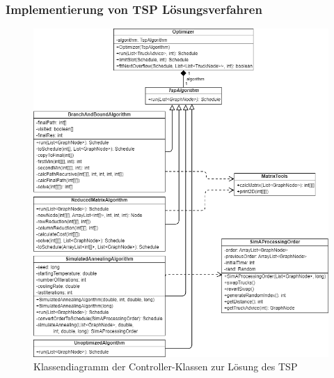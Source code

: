 \subsubsection{Implementierung von TSP Lösungsverfahren}

\begin{figure}[H]
    \centering
    \includegraphics[width=\textwidth]{images/classDiagrams/TSP_Optimizer_ClassDiagram.png}
    \caption{Klassendiagramm der Controller-Klassen zur Lösung des TSP}
    \label{fig:tspClassDiagramOptimizer}
\end{figure}


